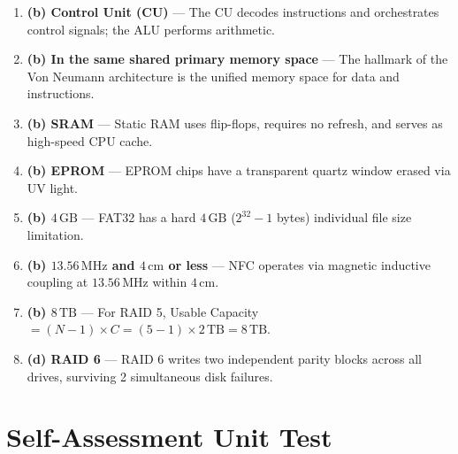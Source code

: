 \begin{solutionbox}
\begin{enumerate}
    \item \textbf{(b) Control Unit (CU)} --- The CU decodes instructions and orchestrates control signals; the ALU performs arithmetic.
    \item \textbf{(b) In the same shared primary memory space} --- The hallmark of the Von Neumann architecture is the unified memory space for data and instructions.
    \item \textbf{(b) SRAM} --- Static RAM uses flip-flops, requires no refresh, and serves as high-speed CPU cache.
    \item \textbf{(b) EPROM} --- EPROM chips have a transparent quartz window erased via UV light.
    \item \textbf{(b) $4\,\text{GB}$} --- FAT32 has a hard $4\,\text{GB}$ ($2^{32}-1$ bytes) individual file size limitation.
    \item \textbf{(b) $13.56\,\text{MHz}$ and $4\,\text{cm}$ or less} --- NFC operates via magnetic inductive coupling at $13.56\,\text{MHz}$ within $4\,\text{cm}$.
    \item \textbf{(b) $8\,\text{TB}$} --- For RAID 5, Usable Capacity $= (N-1) \times C = (5-1) \times 2\,\text{TB} = 8\,\text{TB}$.
    \item \textbf{(d) RAID 6} --- RAID 6 writes two independent parity blocks across all drives, surviving 2 simultaneous disk failures.
\end{enumerate}
\end{solutionbox}

\section{Self-Assessment Unit Test}

